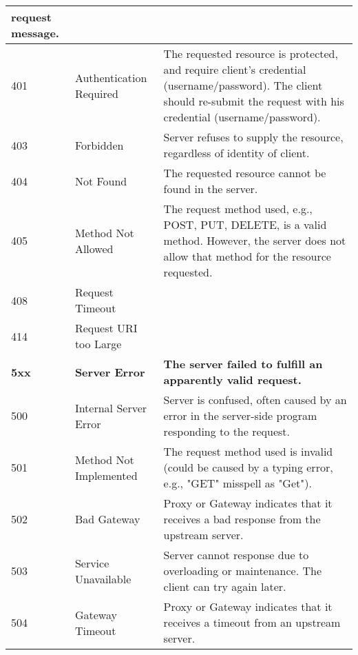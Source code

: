 \documentclass[../main.tex]{subfiles}
\begin{document}
\begin{table}[H]
\begin{center}
\begin{tabular}{|p{3cm}|p{4cm}|p{8cm}|}
                request message.\\
                \hline
                401 & Authentication Required & The requested resource is protected, and require client’s credential
                (username/password). The client should re-submit the request with his credential (username/password).\\
                \hline
                403 & Forbidden & Server refuses to supply the resource, regardless of identity of client.\\
                \hline
                404 & Not Found & The requested resource cannot be found in the server.\\
                \hline
                405 & Method Not Allowed& The request method used, e.g., POST, PUT, DELETE, is a valid method. However,
                the server does not allow that method for the resource requested.\\
                \hline
                408 & Request Timeout &\\
                \hline
                414 & Request URI too Large &\\
                \hline
                \hline
                \textbf{5xx} &
                \textbf{Server Error} &
                \textbf{The server failed to fulfill an apparently valid request.} \\
                \hline
                500 & Internal Server Error & Server is confused, often caused by an error in the server-side program
                responding to the request.\\
                \hline
                501 & Method Not Implemented & The request method used is invalid (could be caused by a typing error,
                e.g., "GET" misspell as "Get").\\
                \hline
                502 & Bad Gateway & Proxy or Gateway indicates that it receives a bad response from the upstream server.\\
                \hline
                503 & Service Unavailable & Server cannot response due to overloading or maintenance. The client can
                try again later.\\
                \hline
                504 & Gateway Timeout & Proxy or Gateway indicates that it receives a timeout from an upstream server.\\
                \hline
            \end{tabular}
        \end{center}
    \end{table}
\end{document}

